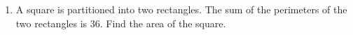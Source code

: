 \documentclass[12pt, twoside]{article}
\begin{document}
\begin{enumerate}
\item A square is partitioned into two rectangles. The sum of the perimeters of the two rectangles is 36. Find the area of the square.
\begin{flushright}
\end{flushright}


\end{enumerate}
\end{document}
